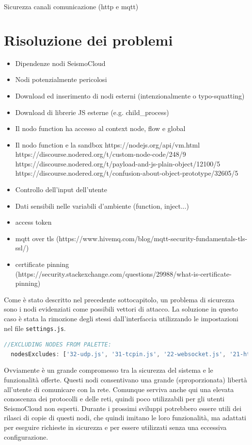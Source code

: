 \documentclass[a4paper,10pt]{memoir}
\begin{document}
Sicurezza canali comunicazione (http e mqtt)


\section{Risoluzione dei problemi}

\begin{itemize}
    \item Dipendenze nodi SeismoCloud
    \item Nodi potenzialmente pericolosi
    \item Download ed inserimento di nodi esterni (intenzionalmente o typo-squatting)
    \item Download di librerie JS esterne (e.g. child\_process)
    \item Il nodo function ha accesso al context node, flow e global
    \item Il nodo function e la sandbox https://nodejs.org/api/vm.html
    https://discourse.nodered.org/t/custom-node-code/248/9
    https://discourse.nodered.org/t/payload-and-js-plain-object/12100/5
    https://discourse.nodered.org/t/confusion-about-object-prototype/32605/5
    \item Controllo dell'input dell'utente
    \item Dati sensibili nelle variabili d'ambiente (function, inject...)
    \item access token
    \item mqtt over tls (https://www.hivemq.com/blog/mqtt-security-fundamentals-tls-ssl/)
    \item certificate pinning (https://security.stackexchange.com/questions/29988/what-is-certificate-pinning)
\end{itemize}

Come è stato descritto nel precedente sottocapitolo, un problema di sicurezza sono i nodi evidenziati come possibili vettori di attacco. La soluzione in questo caso è stata la rimozione degli stessi dall'interfaccia utilizzando le impostazioni nel file \texttt{settings.js}.
\begin{lstlisting}[language=Javascript, firstnumber=75]
//EXCLUDING NODES FROM PALETTE:
  nodesExcludes: ['32-udp.js', '31-tcpin.js', '22-websocket.js', '21-httprequest.js', '21-httpin.js', '10-mqtt.js', '06-httpproxy.js', '05-tls.js', '90-exec.js', 'node-red-node-tail', '10-file.js', '23-watch.js'],
\end{lstlisting}
Ovviamente è un grande compromesso tra la sicurezza del sistema e le funzionalità offerte. Questi nodi consentivano una grande (sproporzionata) libertà all'utente di comunicare con la rete. Comunque serviva anche qui una elevata conoscenza dei protocolli e delle reti, quindi poco utilizzabili per gli utenti SeismoCloud non esperti. Durante i prossimi sviluppi potrebbero essere utili dei rilasci di copie di questi nodi, che quindi imitano le loro funzionalità, ma adattati per eseguire richieste in sicurezza e per essere utilizzati senza una eccessiva configurazione.
\end{document}
